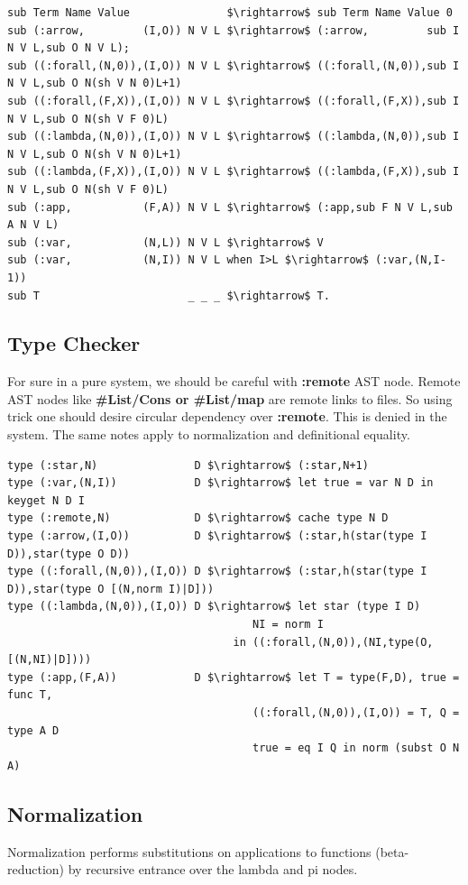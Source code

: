 \documentclass{aip-cp}
\begin{document}
\begin{lstlisting}[mathescape=true]
sub Term Name Value               $\rightarrow$ sub Term Name Value 0
sub (:arrow,         (I,O)) N V L $\rightarrow$ (:arrow,         sub I N V L,sub O N V L);
sub ((:forall,(N,0)),(I,O)) N V L $\rightarrow$ ((:forall,(N,0)),sub I N V L,sub O N(sh V N 0)L+1)
sub ((:forall,(F,X)),(I,O)) N V L $\rightarrow$ ((:forall,(F,X)),sub I N V L,sub O N(sh V F 0)L)
sub ((:lambda,(N,0)),(I,O)) N V L $\rightarrow$ ((:lambda,(N,0)),sub I N V L,sub O N(sh V N 0)L+1)
sub ((:lambda,(F,X)),(I,O)) N V L $\rightarrow$ ((:lambda,(F,X)),sub I N V L,sub O N(sh V F 0)L)
sub (:app,           (F,A)) N V L $\rightarrow$ (:app,sub F N V L,sub A N V L)
sub (:var,           (N,L)) N V L $\rightarrow$ V
sub (:var,           (N,I)) N V L when I>L $\rightarrow$ (:var,(N,I-1))
sub T                       _ _ _ $\rightarrow$ T.
\end{lstlisting}

\subsection{Type Checker}
For sure in a pure system, we should be careful with {\bf :remote} AST node. Remote
AST nodes like {\bf \#List/Cons or \#List/map} are remote links to files. So using
trick one should desire circular dependency over {\bf :remote}. This is denied in
the system. The same notes apply to normalization and definitional equality.

\begin{lstlisting}[mathescape=true]
type (:star,N)               D $\rightarrow$ (:star,N+1)
type (:var,(N,I))            D $\rightarrow$ let true = var N D in keyget N D I
type (:remote,N)             D $\rightarrow$ cache type N D
type (:arrow,(I,O))          D $\rightarrow$ (:star,h(star(type I D)),star(type O D))
type ((:forall,(N,0)),(I,O)) D $\rightarrow$ (:star,h(star(type I D)),star(type O [(N,norm I)|D]))
type ((:lambda,(N,0)),(I,O)) D $\rightarrow$ let star (type I D)
                                      NI = norm I
                                   in ((:forall,(N,0)),(NI,type(O,[(N,NI)|D])))
type (:app,(F,A))            D $\rightarrow$ let T = type(F,D), true = func T,
                                      ((:forall,(N,0)),(I,O)) = T, Q = type A D
                                      true = eq I Q in norm (subst O N A)
\end{lstlisting}

\subsection{Normalization}
Normalization performs substitutions on applications to functions (beta-reduction)
by recursive entrance over the lambda and pi nodes.
\end{document}
